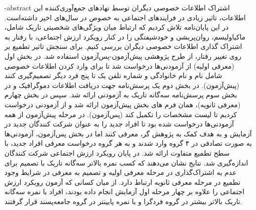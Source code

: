 \fa-abstract{
اشتراک اطلاعات خصوصی دیگران توسط نهادهای جمع‌آوری‌کننده این اطلاعات، تاثیر زیادی در فرایند‌های اجتماعی به خصوص در سال‌های اخیر داشته‌است. در این پایان‌نامه تلاش کردیم که ارتباط میان 
ویژگی‌های شخصیتی تاریک شامل، ماکیاولیسم، روا‌ن‌پریشی و خودشیفتگی را در کنار رویکرد ارزش اجتماعی، با رفتار به اشتراک گذاری اطلاعات خصوصی دیگران بررسی کنیم.
برای سنجش تاثیر تطمیع بر روی تغییر رفتار، از طرح پژوهشی پیش‌آزمون-پس‌آزمون استفاده شد. در بخش اول
\!(معرفی اولیه)
از آزمودنی‌ها درخواست شد تا برای وارد کردن اطلاعات خصوصی شامل نام و نام خانوادگی و شماره تلفن یک تا پنج فرد دیگر تصمیم‌گیری کنند
\!(پیش‌آزمون).
 در بخش دوم یک پرسش‌نامه جهت دریافت اطلاعات دموگرافیک و در بخش سوم پرسش‌نامه سه‌گانه تاریک به آزمودنی ارائه شد. سپس در بخش چهارم
\!(معرفی ثانویه)،
همان فرم های بخش پیش‌آزمون ارائه شد و از آزمودنی درخواست کردیم تا لیست مشخصات را تکمیل کند
\!(پس‌آزمون).
در مرحله پیش‌آزمون از همه آزمودنی‌ها درخواست شده بود تا افراد جدید را به عنوان شرکت کنندگان جدید در آزمایش و به هدف کمک به پژوهش گر، معرفی کنند
 اما در بخش پس‌آزمون، آزمودنی‌ها به صورت تصادفی در ۴ گروه وارد شدند و به هر گروه درخواست معرفی افراد جدید، با سطح تطمیع متفاوت ارائه شد.
در پایان رویکرد ارزش اجتماعی شرکت کنندگان اندازه‌گیری شد. نتایج نشان می‌دهند که کسب نمره بالاتر
سه‌گانه تاریک با تصمیم برای عدم به اشتراک‌گذاری در مرحله معرفی اولیه و تصمیم به معرفی در شرایط وجود تطمیع در مرحله معرفی ثانویه ارتباط دارد.
از میان کسانی که آزمون رویکرد ارزش اجتماعی را علاوه بر چهار مرحله اول آزمایش انجام داده بودند، افراد با نمره سه‌گانه تاریک بالاتر بیشتر در گروه 
فردگرا و با نمره پایینتر در گروه جامعه‌پسند قرار گرفتند.
}
\titlePage
\ifoptiondraft{}{%
	\besmPage
	\titlePage
	\davaranPage


	\esalatPage
	\mojavezPage
	\taghdimPage
	\ghadrdaniPage
} %
\abstractPage
\newpage\clearpage
{} %
\tableofcontents \newpage

\pagestyle{fancy}